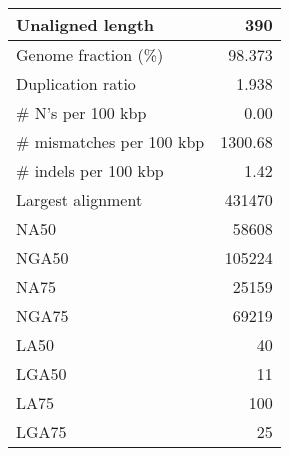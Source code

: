 \documentclass[12pt,a4paper]{article}
\begin{document}
\begin{table}[ht]
\begin{center}
\begin{tabular}{|l*{1}{|r}|}
Unaligned length & 390 \\ \hline
Genome fraction (\%) & 98.373 \\ \hline
Duplication ratio & 1.938 \\ \hline
\# N's per 100 kbp & 0.00 \\ \hline
\# mismatches per 100 kbp & 1300.68 \\ \hline
\# indels per 100 kbp & 1.42 \\ \hline
Largest alignment & 431470 \\ \hline
NA50 & 58608 \\ \hline
NGA50 & 105224 \\ \hline
NA75 & 25159 \\ \hline
NGA75 & 69219 \\ \hline
LA50 & 40 \\ \hline
LGA50 & 11 \\ \hline
LA75 & 100 \\ \hline
LGA75 & 25 \\ \hline
\end{tabular}
\end{center}
\end{table}
\end{document}
